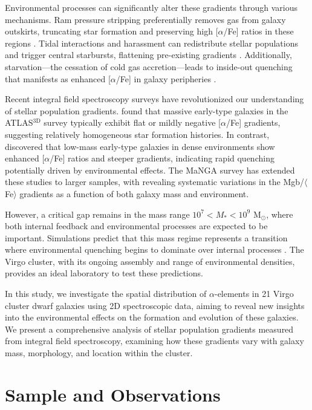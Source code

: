 \documentclass[linenumbers,trackchanges,twocolumn]{aastex631}
\begin{document}
Environmental processes can significantly alter these gradients through various mechanisms. Ram pressure stripping preferentially removes gas from galaxy outskirts, truncating star formation and preserving high [$\alpha$/Fe] ratios in these regions \citep{Gunn1972, Boselli2008a}. Tidal interactions and harassment can redistribute stellar populations and trigger central starbursts, flattening pre-existing gradients \citep{Moore1996}. Additionally, starvation—the cessation of cold gas accretion—leads to inside-out quenching that manifests as enhanced [$\alpha$/Fe] in galaxy peripheries \citep{Larson1980, Peng2015}.

Recent integral field spectroscopy surveys have revolutionized our understanding of stellar population gradients. \citet{McDermid_2015} found that massive early-type galaxies in the ATLAS$^{3\mathrm{D}}$ survey typically exhibit flat or mildly negative [$\alpha$/Fe] gradients, suggesting relatively homogeneous star formation histories. In contrast, \citet{Liu_2016} discovered that low-mass early-type galaxies in dense environments show enhanced [$\alpha$/Fe] ratios and steeper gradients, indicating rapid quenching potentially driven by environmental effects. The MaNGA survey has extended these studies to larger samples, with \citet{Zheng_2019} revealing systematic variations in the Mgb/$\langle$Fe$\rangle$ gradients as a function of both galaxy mass and environment.

However, a critical gap remains in the mass range $10^7 < M_* < 10^9$ M$_{\odot}$, where both internal feedback and environmental processes are expected to be important. Simulations predict that this mass regime represents a transition where environmental quenching begins to dominate over internal processes \citep{Mistani2016}. The Virgo cluster, with its ongoing assembly and range of environmental densities, provides an ideal laboratory to test these predictions.

In this study, we investigate the spatial distribution of $\alpha$-elements in 21 Virgo cluster dwarf galaxies using 2D spectroscopic data, aiming to reveal new insights into the environmental effects on the formation and evolution of these galaxies. We present a comprehensive analysis of stellar population gradients measured from integral field spectroscopy, examining how these gradients vary with galaxy mass, morphology, and location within the cluster.

\section{Sample and Observations}
\end{document}
